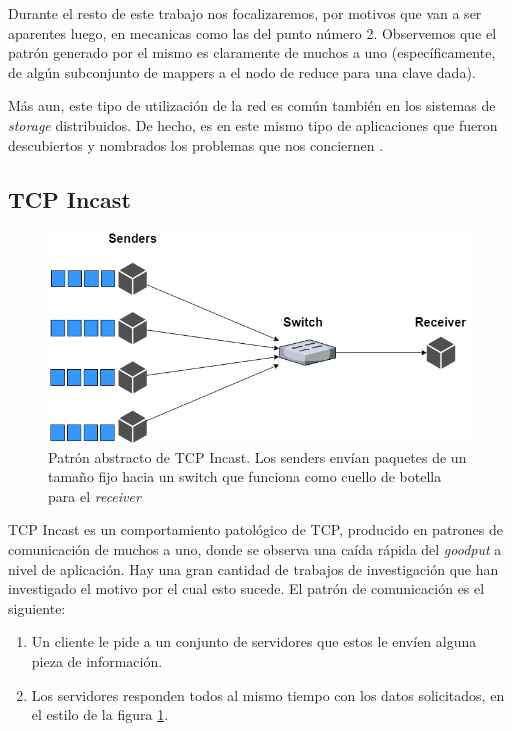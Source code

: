 \documentclass[runningheads,a4paper]{llncs}
\begin{document}
Durante el resto de este trabajo nos focalizaremos, por motivos que van a ser aparentes luego, en mecanicas como las del punto número 2. Observemos que el patrón generado por el mismo es claramente de muchos a uno (específicamente, de algún subconjunto de mappers a el nodo de reduce para una clave dada).

Más aun, este tipo de utilización de la red es común también en los sistemas de \textit{storage} distribuidos. De hecho, es en este mismo tipo de aplicaciones que fueron descubiertos y nombrados los problemas que nos conciernen \cite{Nagle_Panasas_2004}.

\subsection{TCP Incast}

\begin{figure}[b!]
    \centering
    \includegraphics[width=1\textwidth]{figures/TCP_Incast_Pattern.png}
    \caption{Patrón abstracto de TCP Incast. Los senders envían paquetes de un tamaño fijo hacia un switch que funciona como cuello de botella para el \textit{receiver}}
    \label{fig:tcp_incast_pattern}
\end{figure}

TCP Incast es un comportamiento patológico de TCP, producido en patrones de comunicación de muchos a uno, donde se observa una caída rápida del \textit{goodput} a nivel de aplicación. Hay una gran cantidad de trabajos de investigación que han investigado el motivo por el cual esto sucede. El patrón de comunicación es el siguiente\cite{Phanishayee_Throughput_2008}\cite{Qin_TCP_2016}:

\begin{enumerate}
    \item Un cliente le pide a un conjunto de servidores que estos le envíen alguna pieza de información.
    
    \item Los servidores responden todos al mismo tiempo con los datos solicitados, en el estilo de la figura \ref{fig:tcp_incast_pattern}.
\end{enumerate}
\end{document}
